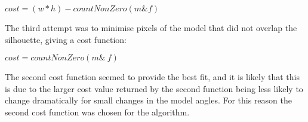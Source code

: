 \centerline{$cost = (w * h) - countNonZero(m \& f)$}

The third attempt was to minimise pixels of the model that did not overlap the silhouette, giving a cost function:

\centerline{$cost = countNonZero(m \& ~f)$}

The second cost function seemed to provide the best fit, and it is likely that this is due to the larger cost value returned by the second function being less likely to change dramatically for small changes in the model angles. For this reason the second cost function was chosen for the algorithm.